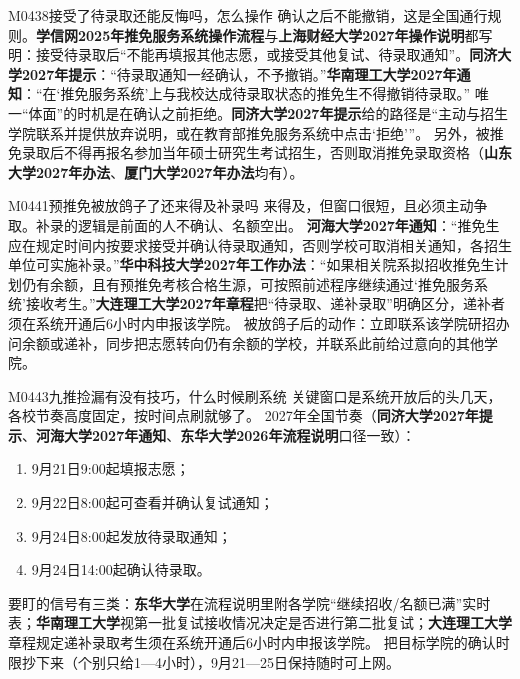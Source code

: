 \begin{qa}{M0438}{接受了待录取还能反悔吗，怎么操作}
确认之后不能撤销，这是全国通行规则。\textbf{学信网2025年推免服务系统操作流程}与\textbf{上海财经大学2027年操作说明}都写明：接受待录取后“不能再填报其他志愿，或接受其他复试、待录取通知”。\textbf{同济大学2027年提示}：“待录取通知一经确认，不予撤销。”\textbf{华南理工大学2027年通知}：“在‘推免服务系统’上与我校达成待录取状态的推免生不得撤销待录取。”
唯一“体面”的时机是在确认之前拒绝。\textbf{同济大学2027年提示}给的路径是“主动与招生学院联系并提供放弃说明，或在教育部推免服务系统中点击‘拒绝’”。
另外，被推免录取后不得再报名参加当年硕士研究生考试招生，否则取消推免录取资格（\textbf{山东大学2027年办法}、\textbf{厦门大学2027年办法}均有）。
\end{qa}

\begin{qa}{M0441}{预推免被放鸽子了还来得及补录吗}
来得及，但窗口很短，且必须主动争取。补录的逻辑是前面的人不确认、名额空出。
\textbf{河海大学2027年通知}：“推免生应在规定时间内按要求接受并确认待录取通知，否则学校可取消相关通知，各招生单位可实施补录。”\textbf{华中科技大学2027年工作办法}：“如果相关院系拟招收推免生计划仍有余额，且有预推免考核合格生源，可按照前述程序继续通过‘推免服务系统’接收考生。”\textbf{大连理工大学2027年章程}把“待录取、递补录取”明确区分，递补者须在系统开通后6小时内申报该学院。
被放鸽子后的动作：立即联系该学院研招办问余额或递补，同步把志愿转向仍有余额的学校，并联系此前给过意向的其他学院。
\end{qa}

\begin{qa}{M0443}{九推捡漏有没有技巧，什么时候刷系统}
关键窗口是系统开放后的头几天，各校节奏高度固定，按时间点刷就够了。
2027年全国节奏（\textbf{同济大学2027年提示}、\textbf{河海大学2027年通知}、\textbf{东华大学2026年流程说明}口径一致）：
\begin{enumerate}
  \item 9月21日9:00起填报志愿；
  \item 9月22日8:00起可查看并确认复试通知；
  \item 9月24日8:00起发放待录取通知；
  \item 9月24日14:00起确认待录取。
\end{enumerate}
要盯的信号有三类：\textbf{东华大学}在流程说明里附各学院“继续招收/名额已满”实时表；\textbf{华南理工大学}视第一批复试接收情况决定是否进行第二批复试；\textbf{大连理工大学}章程规定递补录取考生须在系统开通后6小时内申报该学院。
把目标学院的确认时限抄下来（个别只给1—4小时），9月21—25日保持随时可上网。
\end{qa}

